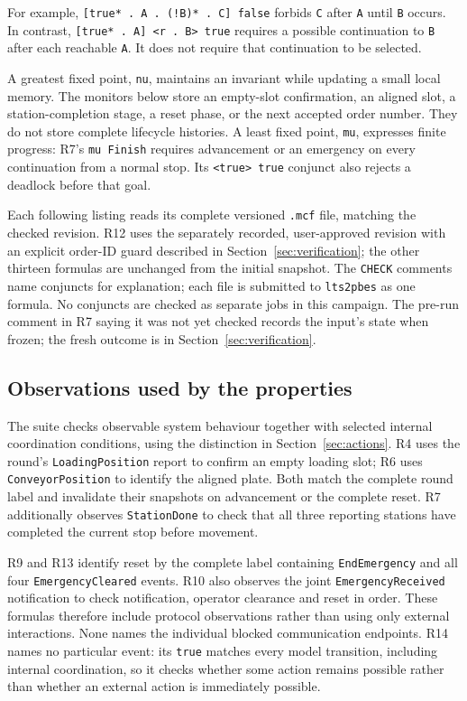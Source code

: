 \documentclass[11pt,a4paper]{article}
\begin{document}
For example, \texttt{[true* . A . (!B)* . C] false} forbids \texttt{C} after \texttt{A} until \texttt{B} occurs. In contrast, \texttt{[true* . A] <r . B> true} requires a possible continuation to \texttt{B} after each reachable \texttt{A}. It does not require that continuation to be selected.

A greatest fixed point, \texttt{nu}, maintains an invariant while updating a small local memory. The monitors below store an empty-slot confirmation, an aligned slot, a station-completion stage, a reset phase, or the next accepted order number. They do not store complete lifecycle histories. A least fixed point, \texttt{mu}, expresses finite progress: R7's \texttt{mu Finish} requires advancement or an emergency on every continuation from a normal stop. Its \texttt{<true> true} conjunct also rejects a deadlock before that goal.

Each following listing reads its complete versioned \texttt{.mcf} file, matching the checked revision. R12 uses the separately recorded, user-approved revision with an explicit order-ID guard described in Section~\ref{sec:verification}; the other thirteen formulas are unchanged from the initial snapshot. The \texttt{CHECK} comments name conjuncts for explanation; each file is submitted to \texttt{lts2pbes} as one formula. No conjuncts are checked as separate jobs in this campaign. The pre-run comment in R7 saying it was not yet checked records the input's state when frozen; the fresh outcome is in Section~\ref{sec:verification}.

\subsection{Observations used by the properties}
The suite checks observable system behaviour together with selected internal coordination conditions, using the distinction in Section~\ref{sec:actions}. R4 uses the round's \texttt{LoadingPosition} report to confirm an empty loading slot; R6 uses \texttt{ConveyorPosition} to identify the aligned plate. Both match the complete round label and invalidate their snapshots on advancement or the complete reset. R7 additionally observes \texttt{StationDone} to check that all three reporting stations have completed the current stop before movement.

R9 and R13 identify reset by the complete label containing \texttt{EndEmergency} and all four \texttt{EmergencyCleared} events. R10 also observes the joint \texttt{EmergencyReceived} notification to check notification, operator clearance and reset in order. These formulas therefore include protocol observations rather than using only external interactions. None names the individual blocked communication endpoints. R14 names no particular event: its \texttt{true} matches every model transition, including internal coordination, so it checks whether some action remains possible rather than whether an external action is immediately possible.
\end{document}

